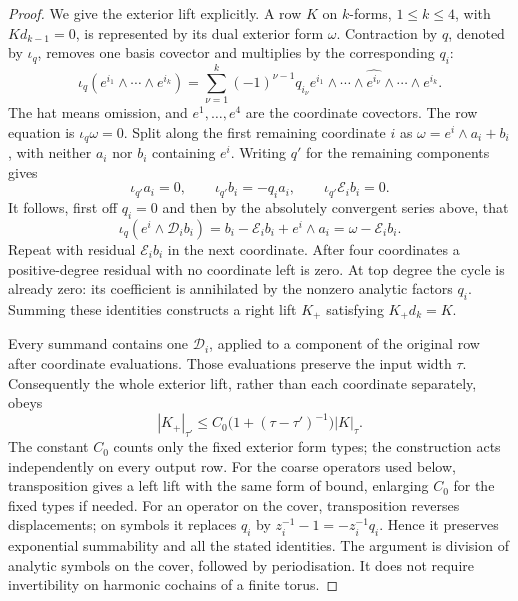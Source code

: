 \documentclass[11pt,reqno]{amsart}
\numberwithin{equation}{section}
\theoremstyle{definition}
\theoremstyle{remark}
\begin{document}
\begin{proof}
We give the exterior lift explicitly. A row \(K\) on
\(k\)-forms, \(1\le k\le4\), with \(Kd_{k-1}=0\), is
represented by its dual exterior form \(\omega\).
Contraction by \(q\), denoted by \(\iota_q\), removes one
basis covector and multiplies by the corresponding \(q_i\):
\[
 \iota_q(e^{i_1}\wedge\cdots\wedge e^{i_k})
 =\sum_{\nu=1}^k(-1)^{\nu-1}q_{i_\nu}
       e^{i_1}\wedge\cdots\wedge
       \widehat{e^{i_\nu}}\wedge\cdots\wedge e^{i_k}.
\]
The hat means omission, and \(e^1,\ldots,e^4\) are the
coordinate covectors. The row equation is
\(\iota_q\omega=0\).
Split along the first remaining coordinate \(i\) as
\(\omega=e^i\wedge a_i+b_i\), with neither \(a_i\) nor
\(b_i\) containing \(e^i\). Writing \(q'\) for the remaining
components gives
\[
 \iota_{q'}a_i=0,\qquad
 \iota_{q'}b_i=-q_i a_i,\qquad
 \iota_{q'}\mathcal E_i b_i=0.
\]
It follows, first off \(q_i=0\) and then by the absolutely
convergent series above, that
\[
 \iota_q(e^i\wedge\mathcal D_i b_i)
       =b_i-\mathcal E_i b_i+e^i\wedge a_i
       =\omega-\mathcal E_i b_i.
\]
Repeat with residual \(\mathcal E_i b_i\) in the next
coordinate. After four coordinates a positive-degree residual
with no coordinate left is zero. At top degree the cycle is
already zero: its coefficient is annihilated by the nonzero
analytic factors \(q_i\). Summing these identities constructs
a right lift \(K_+\) satisfying \(K_+d_k=K\).

Every summand contains one \(\mathcal D_i\), applied to a
component of the original row after coordinate evaluations.
Those evaluations preserve the input width \(\tau\).
Consequently the whole exterior lift, rather than each
coordinate separately, obeys
\begin{equation}
 |K_+|_{\tau'}
 \le C_0\bigl(1+(\tau-\tau')^{-1}\bigr)|K|_\tau.
 \label{eq:packet-exterior-lift-bound}
\end{equation}
The constant \(C_0\) counts only the fixed exterior form
types; the construction acts independently on every output
row. For the coarse operators used below, transposition gives
a left lift with the same form of bound, enlarging \(C_0\)
for the fixed types if needed.
For an operator on the cover, transposition reverses
displacements; on symbols it replaces \(q_i\) by
\(z_i^{-1}-1=-z_i^{-1}q_i\). Hence it preserves exponential
summability and all the stated identities. The argument is
division of analytic symbols on the cover, followed by
periodisation. It does not require invertibility on harmonic
cochains of a finite torus.


\end{proof}
\end{document}
